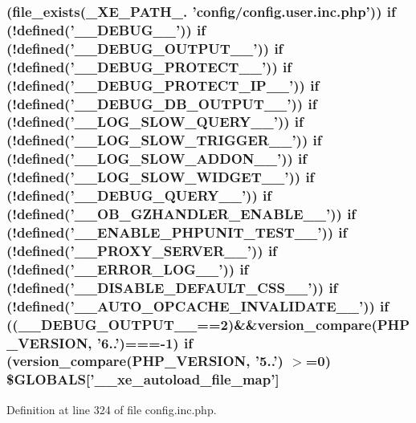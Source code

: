 \hypertarget{config_8inc_8php_a737fba8474c2f7703c9e721a81b6d14f}{
\subsubsection[{\$\-G\-L\-O\-B\-A\-L\-S}]{ (file\-\_\-exists(\-\_\-\-X\-E\-\_\-\-P\-A\-T\-H\-\_\-. 'config/config.\-user.\-inc.\-php')) {\bf if} (!defined('\-\_\-\-\_\-\-D\-E\-B\-U\-G\-\_\-\-\_\-')) {\bf if} (!defined('\-\_\-\-\_\-\-D\-E\-B\-U\-G\-\_\-\-O\-U\-T\-P\-U\-T\-\_\-\-\_\-')) {\bf if} (!defined('\-\_\-\-\_\-\-D\-E\-B\-U\-G\-\_\-\-P\-R\-O\-T\-E\-C\-T\-\_\-\-\_\-')) {\bf if} (!defined('\-\_\-\-\_\-\-D\-E\-B\-U\-G\-\_\-\-P\-R\-O\-T\-E\-C\-T\-\_\-\-I\-P\-\_\-\-\_\-')) {\bf if} (!defined('\-\_\-\-\_\-\-D\-E\-B\-U\-G\-\_\-\-D\-B\-\_\-\-O\-U\-T\-P\-U\-T\-\_\-\-\_\-')) {\bf if} (!defined('\-\_\-\-\_\-\-L\-O\-G\-\_\-\-S\-L\-O\-W\-\_\-\-Q\-U\-E\-R\-Y\-\_\-\-\_\-')) {\bf if} (!defined('\-\_\-\-\_\-\-L\-O\-G\-\_\-\-S\-L\-O\-W\-\_\-\-T\-R\-I\-G\-G\-E\-R\-\_\-\-\_\-')) {\bf if} (!defined('\-\_\-\-\_\-\-L\-O\-G\-\_\-\-S\-L\-O\-W\-\_\-\-A\-D\-D\-O\-N\-\_\-\-\_\-')) {\bf if} (!defined('\-\_\-\-\_\-\-L\-O\-G\-\_\-\-S\-L\-O\-W\-\_\-\-W\-I\-D\-G\-E\-T\-\_\-\-\_\-')) {\bf if} (!defined('\-\_\-\-\_\-\-D\-E\-B\-U\-G\-\_\-\-Q\-U\-E\-R\-Y\-\_\-\-\_\-')) {\bf if} (!defined('\-\_\-\-\_\-\-O\-B\-\_\-\-G\-Z\-H\-A\-N\-D\-L\-E\-R\-\_\-\-E\-N\-A\-B\-L\-E\-\_\-\-\_\-')) {\bf if} (!defined('\-\_\-\-\_\-\-E\-N\-A\-B\-L\-E\-\_\-\-P\-H\-P\-U\-N\-I\-T\-\_\-\-T\-E\-S\-T\-\_\-\-\_\-')) {\bf if} (!defined('\-\_\-\-\_\-\-P\-R\-O\-X\-Y\-\_\-\-S\-E\-R\-V\-E\-R\-\_\-\-\_\-')) {\bf if} (!defined('\-\_\-\-\_\-\-E\-R\-R\-O\-R\-\_\-\-L\-O\-G\-\_\-\-\_\-')) {\bf if} (!defined('\-\_\-\-\_\-\-D\-I\-S\-A\-B\-L\-E\-\_\-\-D\-E\-F\-A\-U\-L\-T\-\_\-\-C\-S\-S\-\_\-\-\_\-')) {\bf if} (!defined('\-\_\-\-\_\-\-A\-U\-T\-O\-\_\-\-O\-P\-C\-A\-C\-H\-E\-\_\-\-I\-N\-V\-A\-L\-I\-D\-A\-T\-E\-\_\-\-\_\-')) {\bf if} ((\-\_\-\-\_\-\-D\-E\-B\-U\-G\-\_\-\-O\-U\-T\-P\-U\-T\-\_\-\-\_\-==2)\&\&version\-\_\-compare(P\-H\-P\-\_\-\-V\-E\-R\-S\-I\-O\-N, '6..')===-\/1) {\bf if} (version\-\_\-compare(P\-H\-P\-\_\-\-V\-E\-R\-S\-I\-O\-N, '5..') $>$=0) \$G\-L\-O\-B\-A\-L\-S\mbox{[}'\-\_\-\-\_\-xe\-\_\-autoload\-\_\-file\-\_\-map'\mbox{]}}}\label{config_8inc_8php_a737fba8474c2f7703c9e721a81b6d14f}


Definition at line 324 of file config.\-inc.\-php.

